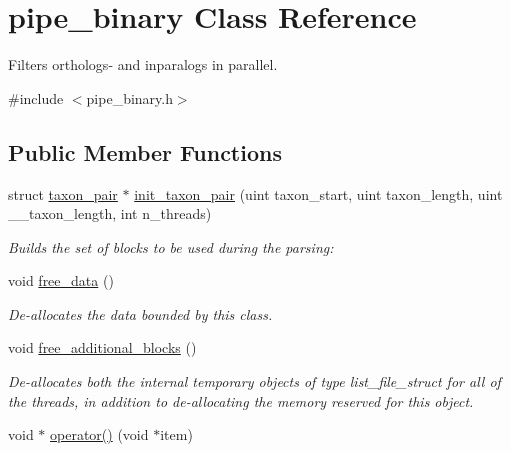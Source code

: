 \hypertarget{classpipe__binary}{
\section{pipe\_\-binary Class Reference}
\label{classpipe__binary}
}


Filters orthologs-\/ and inparalogs in parallel.  




{\ttfamily \#include $<$pipe\_\-binary.h$>$}

\subsection*{Public Member Functions}
\begin{DoxyCompactItemize}
\item 
\hypertarget{classpipe__binary_a669a37b09f5fc917cf270fe669db7af8}{
struct \hyperlink{classtaxon__pair}{taxon\_\-pair} $\ast$ \hyperlink{classpipe__binary_a669a37b09f5fc917cf270fe669db7af8}{init\_\-taxon\_\-pair} (uint taxon\_\-start, uint taxon\_\-length, uint \_\-\_\-taxon\_\-length, int n\_\-threads)}
\label{classpipe__binary_a669a37b09f5fc917cf270fe669db7af8}

\begin{DoxyCompactList}\small\item\em Builds the set of blocks to be used during the parsing: \end{DoxyCompactList}\item 
\hypertarget{classpipe__binary_a8bc46e5e671e28528ec4bb9dae539825}{
void \hyperlink{classpipe__binary_a8bc46e5e671e28528ec4bb9dae539825}{free\_\-data} ()}
\label{classpipe__binary_a8bc46e5e671e28528ec4bb9dae539825}

\begin{DoxyCompactList}\small\item\em De-\/allocates the data bounded by this class. \end{DoxyCompactList}\item 
\hypertarget{classpipe__binary_ab5f4cfcb2460e1d832673145416247e1}{
void \hyperlink{classpipe__binary_ab5f4cfcb2460e1d832673145416247e1}{free\_\-additional\_\-blocks} ()}
\label{classpipe__binary_ab5f4cfcb2460e1d832673145416247e1}

\begin{DoxyCompactList}\small\item\em De-\/allocates both the internal temporary objects of type list\_\-file\_\-struct for all of the threads, in addition to de-\/allocating the memory reserved for this object. \end{DoxyCompactList}\item 
\hypertarget{classpipe__binary_adac41e0b3790ab30fa6d6d9ae445b9d9}{
void $\ast$ \hyperlink{classpipe__binary_adac41e0b3790ab30fa6d6d9ae445b9d9}{operator()} (void $\ast$item)}
\label{classpipe__binary_adac41e0b3790ab30fa6d6d9ae445b9d9}


\end{DoxyCompactItemize}
